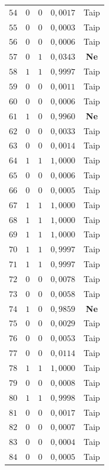 \begin{longtable}{ccccc}
    $54$ & $0$ & $0$ & $0{,}0017$ & Taip \\
    $55$ & $0$ & $0$ & $0{,}0003$ & Taip \\
    $56$ & $0$ & $0$ & $0{,}0006$ & Taip \\
    \rowcolor{pink} $57$ & $0$ & $1$ & $0{,}0343$ & \textbf{Ne} \\
    $58$ & $1$ & $1$ & $0{,}9997$ & Taip \\
    $59$ & $0$ & $0$ & $0{,}0011$ & Taip \\
    $60$ & $0$ & $0$ & $0{,}0006$ & Taip \\
    \rowcolor{pink} $61$ & $1$ & $0$ & $0{,}9960$ & \textbf{Ne} \\
    $62$ & $0$ & $0$ & $0{,}0033$ & Taip \\
    $63$ & $0$ & $0$ & $0{,}0014$ & Taip \\
    $64$ & $1$ & $1$ & $1{,}0000$ & Taip \\
    $65$ & $0$ & $0$ & $0{,}0006$ & Taip \\
    $66$ & $0$ & $0$ & $0{,}0005$ & Taip \\
    $67$ & $1$ & $1$ & $1{,}0000$ & Taip \\
    $68$ & $1$ & $1$ & $1{,}0000$ & Taip \\
    $69$ & $1$ & $1$ & $1{,}0000$ & Taip \\
    $70$ & $1$ & $1$ & $0{,}9997$ & Taip \\
    $71$ & $1$ & $1$ & $0{,}9997$ & Taip \\
    $72$ & $0$ & $0$ & $0{,}0078$ & Taip \\
    $73$ & $0$ & $0$ & $0{,}0058$ & Taip \\
    \rowcolor{pink} $74$ & $1$ & $0$ & $0{,}9859$ & \textbf{Ne} \\
    $75$ & $0$ & $0$ & $0{,}0029$ & Taip \\
    $76$ & $0$ & $0$ & $0{,}0053$ & Taip \\
    $77$ & $0$ & $0$ & $0{,}0114$ & Taip \\
    $78$ & $1$ & $1$ & $1{,}0000$ & Taip \\
    $79$ & $0$ & $0$ & $0{,}0008$ & Taip \\
    $80$ & $1$ & $1$ & $0{,}9998$ & Taip \\
    $81$ & $0$ & $0$ & $0{,}0017$ & Taip \\
    $82$ & $0$ & $0$ & $0{,}0007$ & Taip \\
    $83$ & $0$ & $0$ & $0{,}0004$ & Taip \\
    $84$ & $0$ & $0$ & $0{,}0005$ & Taip \\

\end{longtable}
